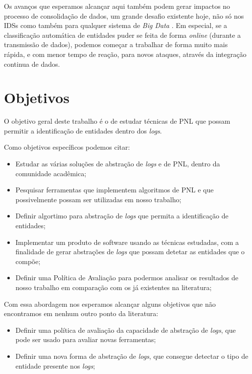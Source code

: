 \documentclass[
	12pt,				%
	openright,			%
	twoside,			%
	a4paper,			%
	english,			%
	spanish,			%
	brazil,				%
	]{abntex2}
\begin{document}
Os avanços que esperamos alcançar aqui também podem gerar impactos no processo de consolidação de dados, um grande desafio existente hoje, não só nos IDSs como também para qualquer sistema de \emph{Big Data} \cite{zuech2015intrusion}. Em especial, se a classificação automática de entidades puder se feita de forma \emph{online} (durante a transmissão de dados), podemos começar a trabalhar de forma muito mais rápida, e com menor tempo de reação, para novos ataques, através da integração continua de dados.


\section{Objetivos}
O objetivo geral deste trabalho é o de estudar técnicas de PNL que possam permitir a identificação de entidades dentro dos \emph{logs}.

Como objetivos específicos podemos citar:
\begin{itemize}
	\item Estudar as várias soluções de abstração de \emph{logs} e de PNL, dentro da comunidade acadêmica;

	\item Pesquisar ferramentas que implementem algoritmos de PNL e que possivelmente possam ser utilizadas em nosso trabalho;

	\item Definir algortimo para abstração de \emph{logs} que permita a identificação de entidades;

	\item Implementar um produto de software usando as técnicas estudadas, com a finalidade de gerar abstrações de \emph{logs} que possam detetar as entidades que o compõe;

	\item Definir uma Política de Avaliação para podermos analisar os resultados de nosso trabalho em comparação com os já existentes na literatura;

\end{itemize}

Com essa abordagem nos esperamos alcançar alguns objetivos que não encontramos em nenhum outro ponto da literatura:

\begin{itemize}
	\item Definir uma política de avaliação da capacidade de abstração de \emph{logs}, que pode ser usado para avaliar novas ferramentas;
	\item Definir uma nova forma de abstração de \emph{logs}, que consegue detectar o tipo de entidade presente nos \emph{logs};
\end{itemize}
\end{document}

